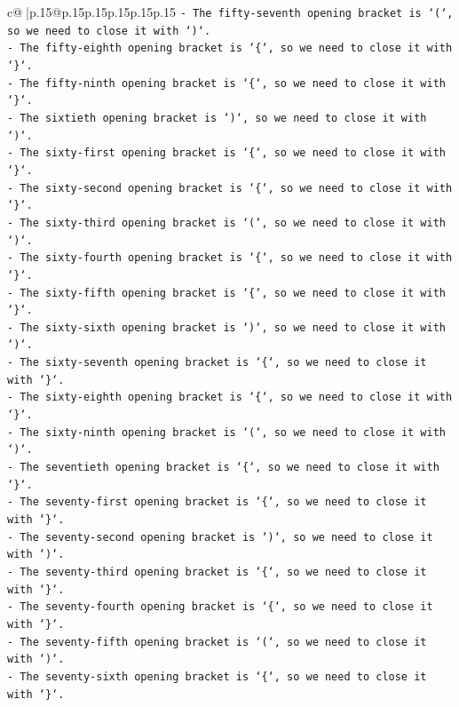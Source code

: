 \documentclass{article}
\begin{document}
{\begin{supertabular}{c@{$\;$}|p{.15\linewidth}@{}p{.15\linewidth}p{.15\linewidth}p{.15\linewidth}p{.15\linewidth}p{.15\linewidth}}
{{{\texttt{{-} The fifty{-}seventh opening bracket is `(`, so we need to close it with `)`.} \\
\texttt{{-} The fifty{-}eighth opening bracket is `\{`, so we need to close it with `\}`.} \\
\texttt{{-} The fifty{-}ninth opening bracket is `\{`, so we need to close it with `\}`.} \\
\texttt{{-} The sixtieth opening bracket is `)`, so we need to close it with `)`.} \\
\texttt{{-} The sixty{-}first opening bracket is `\{`, so we need to close it with `\}`.} \\
\texttt{{-} The sixty{-}second opening bracket is `\{`, so we need to close it with `\}`.} \\
\texttt{{-} The sixty{-}third opening bracket is `(`, so we need to close it with `)`.} \\
\texttt{{-} The sixty{-}fourth opening bracket is `\{`, so we need to close it with `\}`.} \\
\texttt{{-} The sixty{-}fifth opening bracket is `\{`, so we need to close it with `\}`.} \\
\texttt{{-} The sixty{-}sixth opening bracket is `)`, so we need to close it with `)`.} \\
\texttt{{-} The sixty{-}seventh opening bracket is `\{`, so we need to close it with `\}`.} \\
\texttt{{-} The sixty{-}eighth opening bracket is `\{`, so we need to close it with `\}`.} \\
\texttt{{-} The sixty{-}ninth opening bracket is `(`, so we need to close it with `)`.} \\
\texttt{{-} The seventieth opening bracket is `\{`, so we need to close it with `\}`.} \\
\texttt{{-} The seventy{-}first opening bracket is `\{`, so we need to close it with `\}`.} \\
\texttt{{-} The seventy{-}second opening bracket is `)`, so we need to close it with `)`.} \\
\texttt{{-} The seventy{-}third opening bracket is `\{`, so we need to close it with `\}`.} \\
\texttt{{-} The seventy{-}fourth opening bracket is `\{`, so we need to close it with `\}`.} \\
\texttt{{-} The seventy{-}fifth opening bracket is `(`, so we need to close it with `)`.} \\
\texttt{{-} The seventy{-}sixth opening bracket is `\{`, so we need to close it with `\}`.} \\
}}}
\end{supertabular}}
\end{document}
